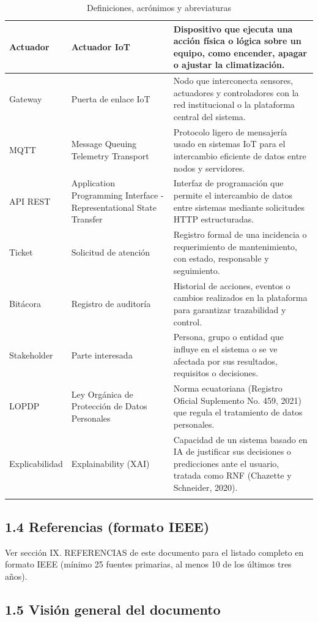 \begin{longtable}{|p{5.2cm}|p{5.2cm}|p{5.2cm}|}
Actuador & Actuador IoT & Dispositivo que ejecuta una acción física o lógica sobre un equipo, como encender, apagar o ajustar la climatización. \\ \hline
Gateway & Puerta de enlace IoT & Nodo que interconecta sensores, actuadores y controladores con la red institucional o la plataforma central del sistema. \\ \hline
MQTT & Message Queuing Telemetry Transport & Protocolo ligero de mensajería usado en sistemas IoT para el intercambio eficiente de datos entre nodos y servidores. \\ \hline
API REST & Application Programming Interface - Representational State Transfer & Interfaz de programación que permite el intercambio de datos entre sistemas mediante solicitudes HTTP estructuradas. \\ \hline
Ticket & Solicitud de atención & Registro formal de una incidencia o requerimiento de mantenimiento, con estado, responsable y seguimiento. \\ \hline
Bitácora & Registro de auditoría & Historial de acciones, eventos o cambios realizados en la plataforma para garantizar trazabilidad y control. \\ \hline
Stakeholder & Parte interesada & Persona, grupo o entidad que influye en el sistema o se ve afectada por sus resultados, requisitos o decisiones. \\ \hline
LOPDP & Ley Orgánica de Protección de Datos Personales & Norma ecuatoriana (Registro Oficial Suplemento No. 459, 2021) que regula el tratamiento de datos personales. \\ \hline
Explicabilidad & Explainability (XAI) & Capacidad de un sistema basado en IA de justificar sus decisiones o predicciones ante el usuario, tratada como RNF (Chazette y Schneider, 2020). \\ \hline
\caption{Definiciones, acrónimos y abreviaturas}
\end{longtable}
\endgroup

\subsection*{1.4 Referencias (formato IEEE)}


Ver sección IX. REFERENCIAS de este documento para el listado completo en formato IEEE (mínimo 25 fuentes primarias, al menos 10 de los últimos tres años).


\subsection*{1.5 Visión general del documento}

